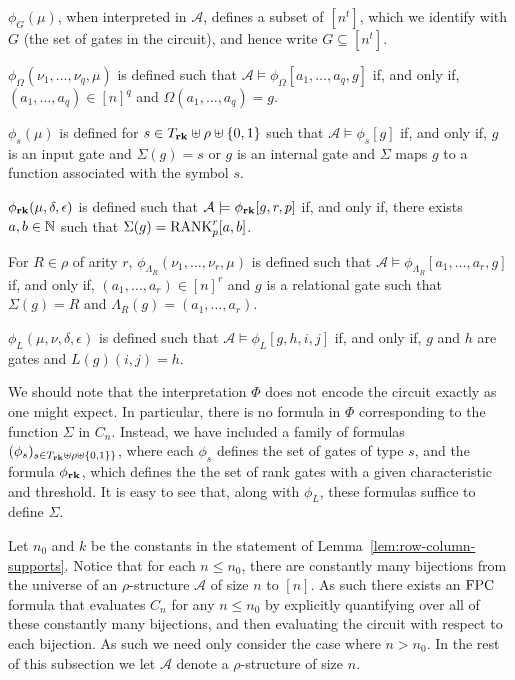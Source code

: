 \documentclass[../main/thesis.tex]{subfiles}
\begin{document}
\begin{myitemize}
\item $\phi_G(\mu)$, when interpreted in $\mathcal{A}$, defines a subset of
  $[n^t]$, which we identify with $G$ (the set of gates in the circuit), and
  hence write $G \subseteq [n^t]$.
\item $\phi_{\Omega}(\nu_1, \ldots , \nu_q, \mu)$ is defined such that
  $\mathcal{A} \models \phi_\Omega[a_1, \ldots, a_q, g]$ if, and only if, $(a_1,
  \ldots, a_q) \in [n]^q$ and $\Omega(a_1, \ldots, a_q) = g$.
\item $\phi_s (\mu)$ is defined for $s \in T_{\text{\textbf{rk}}} \uplus \rho \uplus \{0,1\}$
  such that $\mathcal{A} \models \phi_s [g]$ if, and only if, $g$ is an input
  gate and $\Sigma (g) = s$ or $g$ is an internal gate and $\Sigma$ maps $g$ to
  a function associated with the symbol $s$.
\item $\phi_{\text{\textbf{rk}}}(\mu, \delta, \epsilon)$ is defined such that $\mathcal{A}
  \models \phi_{\text{\textbf{rk}}}[g,r,p]$ if, and only if, there exists $a, b \in \mathbb{N}$
  such that $\Sigma (g) = \text{\upshape RANK}^r_p[a,b]$.
\item For $R \in \rho$ of arity $r$, $\phi_{\Lambda_R}(\nu_1, \ldots, \nu_r,
  \mu)$ is defined such that $\mathcal{A} \models \phi_{\Lambda_R} [a_1, \ldots,
  a_r, g]$ if, and only if, $(a_1, \ldots, a_r)\in [n]^r$ and $g$ is a
  relational gate such that $\Sigma (g) = R$ and $\Lambda_R (g) = (a_1, \ldots,
  a_r)$.
\item $\phi_L(\mu, \nu, \delta, \epsilon)$ is defined such that $\mathcal{A}
  \models \phi_L[g,h,i,j]$ if, and only if, $g$ and $h$ are gates and $L(g)(i,j)
  = h$.
\end{myitemize}

We should note that the interpretation $\Phi$ does not encode the circuit
exactly as one might expect. In particular, there is no formula in $\Phi$
corresponding to the function $\Sigma$ in $C_n$. Instead, we have included a
family of formulas $(\phi_s)_{s \in T_{\text{\textbf{rk}}} \uplus \rho \uplus \{0,1\}\}}$,
where each $\phi_s$ defines the set of gates of type $s$, and the formula
$\phi_{\text{\textbf{rk}}}$, which defines the the set of rank gates with a given
characteristic and threshold. It is easy to see that, along with $\phi_L$, these
formulas suffice to define $\Sigma$.
  
Let $n_0$ and $k$ be the constants in the statement of
Lemma~\ref{lem:row-column-supports}. Notice that for each $n \leq n_0$, there
are constantly many bijections from the universe of an $\rho$-structure
$\mathcal{A}$ of size $n$ to $[n]$. As such there exists an $\text{\upshape FPC}$ formula that
evaluates $C_n$ for any $n \leq n_0$ by explicitly quantifying over all of these
constantly many bijections, and then evaluating the circuit with respect to each
bijection. As such we need only consider the case where $n > n_0$. In the rest
of this subsection we let $\mathcal{A}$ denote a $\rho$-structure of size $n$.
\end{document}
